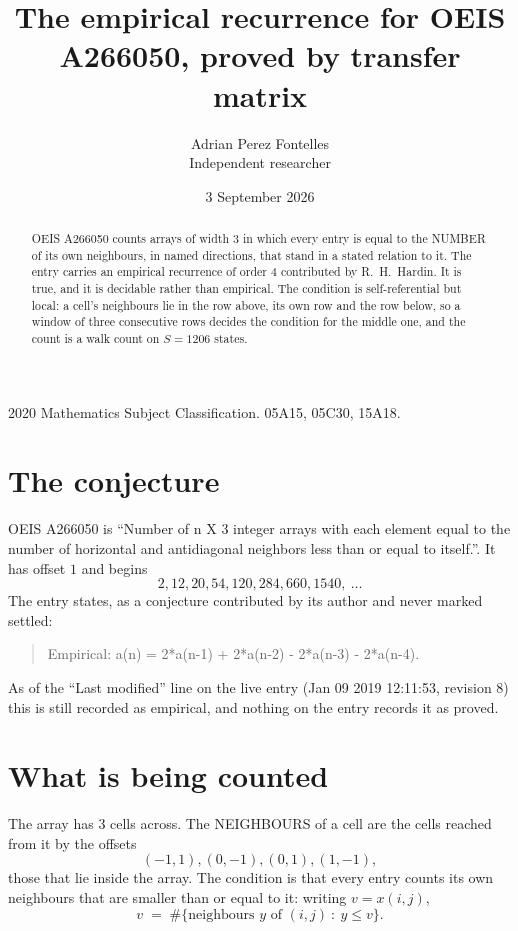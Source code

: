 \documentclass[11pt,a4paper]{article}
\title{The empirical recurrence for OEIS A266050, proved by transfer matrix}
\author{Adrian Perez Fontelles\\ \small Independent researcher}
\date{3 September 2026}
\theoremstyle{plain}
\theoremstyle{definition}
\begin{document}
\maketitle

\begin{abstract}
OEIS A266050 counts arrays of width $3$ in which every entry is equal to the NUMBER of its own
neighbours, in named directions, that stand in a stated relation to it. The entry carries an
empirical recurrence of order $4$ contributed by R.~H.~Hardin. It is true, and it is
decidable rather than empirical. The condition is self-referential but local: a cell's
neighbours lie in the row above, its own row and the row below, so a window of three
consecutive rows decides the condition for the middle one, and the count is a walk count on
$S=1206$ states.
\end{abstract}

\noindent\small 2020 Mathematics Subject Classification. 05A15, 05C30, 15A18.\normalsize

\section{The conjecture}

OEIS A266050 is ``Number of n X 3 integer arrays with each element equal to the number of horizontal and antidiagonal neighbors less than or equal to itself.''. It has offset $1$ and begins
\[
2, 12, 20, 54, 120, 284, 660, 1540,\ \dots
\]
The entry states, as a conjecture contributed by its author and never marked settled:
\begin{quote}
Empirical: a(n) = 2*a(n-1) + 2*a(n-2) - 2*a(n-3) - 2*a(n-4).
\end{quote}
As of the ``Last modified'' line on the live entry (Jan 09 2019 12:11:53, revision 8) this is still
recorded as empirical, and nothing on the entry records it as proved.

\section{What is being counted}

The array has $3$ cells across. The NEIGHBOURS of a cell are the cells reached from it by the
offsets
\[
(-1,1), (0,-1), (0,1), (1,-1),
\]
those that lie inside the array. The condition is that every entry counts its own neighbours
that are smaller than or equal to it: writing $v=x(i,j)$,
\[
v\;=\;\#\{\text{neighbours } y \text{ of } (i,j)\ :\ y\le v\} .
\]
\end{document}
